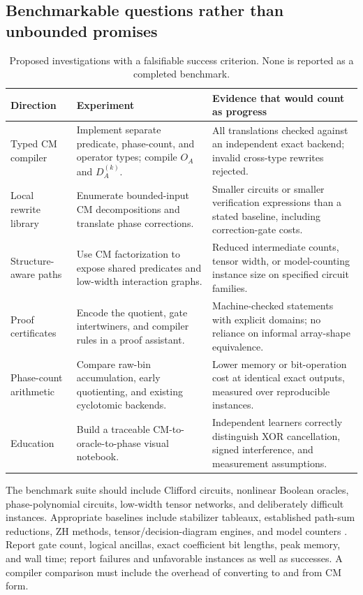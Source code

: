 \subsection{Benchmarkable questions rather than unbounded promises}
\begin{table}[htbp]\centering\small
\begin{tabularx}{\textwidth}{@{}L{0.20\textwidth}Y Y@{}}
\toprule
Direction & Experiment & Evidence that would count as progress\\
\midrule
Typed CM compiler & Implement separate predicate, phase-count, and operator types; compile $O_A$ and $D_A^{(k)}$. & All translations checked against an independent exact backend; invalid cross-type rewrites rejected.\\
Local rewrite library & Enumerate bounded-input CM decompositions and translate phase corrections. & Smaller circuits or smaller verification expressions than a stated baseline, including correction-gate costs.\\
Structure-aware paths & Use CM factorization to expose shared predicates and low-width interaction graphs. & Reduced intermediate counts, tensor width, or model-counting instance size on specified circuit families.\\
Proof certificates & Encode the quotient, gate intertwiners, and compiler rules in a proof assistant. & Machine-checked statements with explicit domains; no reliance on informal array-shape equivalence.\\
Phase-count arithmetic & Compare raw-bin accumulation, early quotienting, and existing cyclotomic backends. & Lower memory or bit-operation cost at identical exact outputs, measured over reproducible instances.\\
Education & Build a traceable CM-to-oracle-to-phase visual notebook. & Independent learners correctly distinguish XOR cancellation, signed interference, and measurement assumptions.\\
\bottomrule
\end{tabularx}
\caption{Proposed investigations with a falsifiable success criterion. None is reported as a completed benchmark.}\label{tab:agenda}
\end{table}

The benchmark suite should include Clifford circuits, nonlinear Boolean oracles, phase-polynomial circuits, low-width tensor networks, and deliberately difficult instances. Appropriate baselines include stabilizer tableaux, established path-sum reductions, ZH methods, tensor/decision-diagram engines, and model counters \cite{aaronson,amy2019,zh,markov,tdd,mei}. Report gate count, logical ancillas, exact coefficient bit lengths, peak memory, and wall time; report failures and unfavorable instances as well as successes. A compiler comparison must include the overhead of converting to and from CM form.

